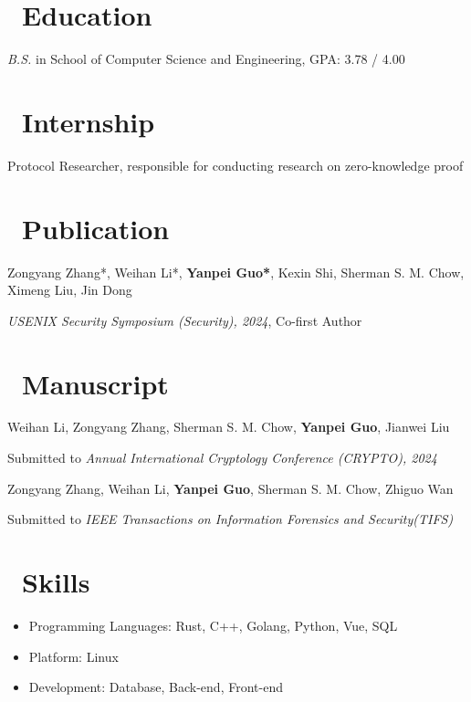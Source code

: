 \documentclass{resume}
\begin{document}



\section{\faGraduationCap\ Education}
\textit{B.S.} in School of Computer Science and Engineering, GPA: 3.78 / 4.00

\section{\faCreditCard\ Internship}
Protocol Researcher, responsible for conducting research on zero-knowledge proof

\section{\faBook\ Publication}

Zongyang Zhang*, Weihan Li*, \textbf{Yanpei Guo*}, Kexin Shi, Sherman S. M. Chow, Ximeng Liu, Jin Dong

\textit{USENIX Security Symposium (Security), 2024}, Co-first Author

\section{\faBookmark\ Manuscript}

Weihan Li, Zongyang Zhang, Sherman S. M. Chow, \textbf{Yanpei Guo}, Jianwei Liu

Submitted to \textit{Annual International Cryptology Conference (CRYPTO), 2024}

Zongyang Zhang, Weihan Li, \textbf{Yanpei Guo}, Sherman S. M. Chow, Zhiguo Wan

Submitted to \textit{IEEE Transactions on Information Forensics and Security(TIFS)}


\section{\faCogs\ Skills}
\begin{itemize}[parsep=0.5ex]
  \item Programming Languages: Rust, C++, Golang, Python, Vue, SQL
  \item Platform: Linux
  \item Development: Database, Back-end, Front-end
\end{itemize}
\end{document}
